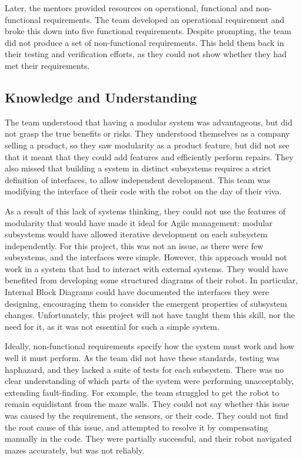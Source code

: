         Later, the mentors provided resources on operational, functional and non-functional requirements.
        The team developed an operational requirement and broke this down into five functional requirements.
        Despite prompting, the team did not produce a set of non-functional requirements.
        This held them back in their testing and verification efforts, as they could not show whether they had met their requirements.

    \subsection{Knowledge and Understanding}\label{subsec:technical-knowledge}
        The team understood that having a modular system was advantageous, but did not grasp the true benefits or risks.
        They understood themselves as a company selling a product, so they saw modularity as a product feature, but did not see that it meant that they could add features and efficiently perform repairs.
        They also missed that building a system in distinct subsystems requires a strict definition of interfaces, to allow independent development.
        This team was modifying the interface of their code with the robot on the day of their viva.

        As a result of this lack of systems thinking, they could not use the features of modularity that would have made it ideal for Agile management: modular subsystems would have allowed iterative development on each subsystem independently.
        For this project, this was not an issue, as there were few subsystems, and the interfaces were simple.
        However, this approach would not work in a system that had to interact with external systems.
        They would have benefited from developing some structured diagrams of their robot.
        In particular, Internal Block Diagrams could have documented the interfaces they were designing, encouraging them to consider the emergent properties of subsystem changes.
        Unfortunately, this project will not have taught them this skill, nor the need for it, as it was not essential for such a simple system.

        Ideally, non-functional requirements specify how the system must work and how well it must perform.
        As the team did not have these standards, testing was haphazard, and they lacked a suite of tests for each subsystem.
        There was no clear understanding of which parts of the system were performing unacceptably, extending fault-finding.
        For example, the team struggled to get the robot to remain equidistant from the maze walls.
        They could not say whether this issue was caused by the requirement, the sensors, or their code.
        They could not find the root cause of this issue, and attempted to resolve it by compensating manually in the code.
        They were partially successful, and their robot navigated mazes accurately, but was not reliably.

